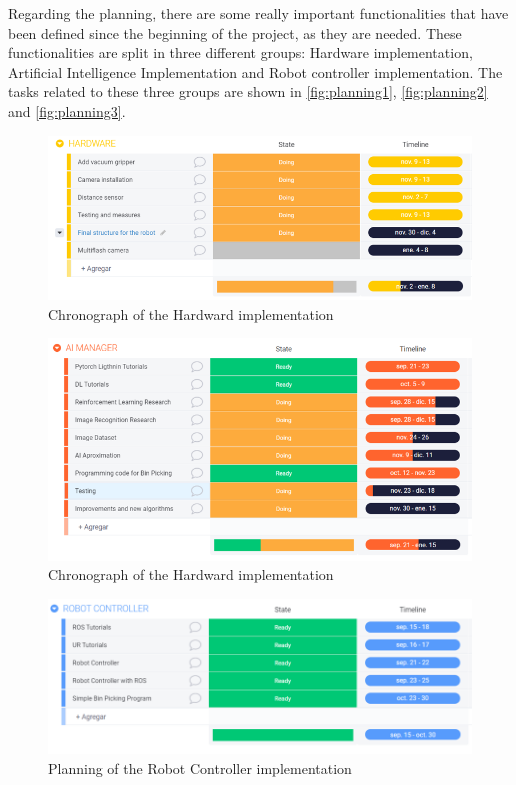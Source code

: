 			Regarding the planning, there are some really important functionalities that have been defined since the beginning of the project, as they are needed. These functionalities are split in three different groups: Hardware implementation, Artificial Intelligence Implementation and Robot controller implementation. The tasks related to these three groups are shown in \autoref{fig:planning1}, \autoref{fig:planning2} and \autoref{fig:planning3}. 
		
		\begin{figure}
			\centering
			\includegraphics[width=0.85\linewidth]{Images/planning1}
			\caption[Chronograph HW]{Chronograph of the Hardward implementation}
			\label{fig:planning1}
		\end{figure}
	
		\begin{figure}
			\centering
			\includegraphics[width=0.85\linewidth]{Images/planning2}
			\caption[Chronograph HW]{Chronograph of the Hardward implementation}
			\label{fig:planning2}
		\end{figure}
		
		\begin{figure}
			\centering
			\includegraphics[width=0.85\linewidth]{Images/planning3}
			\caption[Planing Robot Controller]{Planning of the Robot Controller implementation}
			\label{fig:planning3}
		\end{figure}
		
